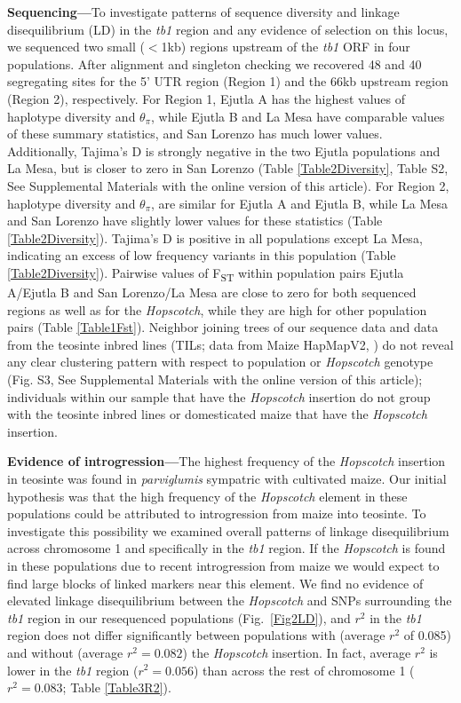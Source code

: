 \documentclass[11pt]{article} %
\begin{document}
\begin{linenumbers}
\begin{flushleft}
\textbf{Sequencing---}To investigate patterns of sequence diversity and linkage disequilibrium (LD) in the \emph{tb1} region and any evidence of selection on this locus, we sequenced two small ($<$1kb) regions upstream of the \emph{tb1} ORF in four populations. After alignment and singleton checking we recovered 48 and 40 segregating sites for the 5' UTR region (Region 1) and the 66kb upstream region (Region 2), respectively. For Region 1, Ejutla A has the highest values of haplotype diversity and $\theta_\pi$, while Ejutla B and La Mesa have comparable values of these summary statistics, and San Lorenzo has much lower values. Additionally, Tajima's D is strongly negative in the two Ejutla populations and La Mesa, but is closer to zero in San Lorenzo (Table \ref{Table2Diversity}, Table S2, See Supplemental Materials with the online version of this article). For Region 2, haplotype diversity and $\theta_\pi$, are similar for Ejutla A and Ejutla B, while La Mesa and San Lorenzo have slightly lower values for these statistics (Table \ref{Table2Diversity}). Tajima's D is positive in all populations except La Mesa, indicating an excess of low frequency variants in this population (Table \ref{Table2Diversity}). Pairwise values of F\textsubscript{ST} within population pairs Ejutla A/Ejutla B and San Lorenzo/La Mesa are close to zero for both sequenced regions as well as for the \emph{Hopscotch}, while they are high for other population pairs (Table \ref{Table1Fst}). Neighbor joining trees of our sequence data and data from the teosinte inbred lines (TILs; data from Maize HapMapV2, \citealt{Chia2012}) do not reveal any clear clustering pattern with respect to population or \emph{Hopscotch} genotype (Fig. S3, See Supplemental Materials with the online version of this article); individuals within our sample that have the \emph{Hopscotch} insertion do not group with the teosinte inbred lines or domesticated maize that have the \emph{Hopscotch} insertion. 

\textbf{Evidence of introgression---}The highest frequency of the \emph{Hopscotch} insertion in teosinte was found in \emph{parviglumis} sympatric with cultivated maize. Our initial hypothesis was that the high frequency of the \emph{Hopscotch} element in these populations could be attributed to introgression from maize into teosinte. To investigate this possibility we examined overall patterns of linkage disequilibrium across chromosome 1 and specifically in the \emph{tb1} region. If the \emph{Hopscotch} is found in these populations due to recent introgression from maize we would expect to find large blocks of linked markers near this element. We find no evidence of elevated linkage disequilibrium between the \emph{Hopscotch} and SNPs surrounding the \emph{tb1} region in our resequenced populations (Fig.~\ref{Fig2LD}), and $r^{2}$ in the \emph{tb1} region  does not differ significantly between populations with (average $r^{2}$ of 0.085) and without (average $r^{2}=0.082$) the \emph{Hopscotch} insertion. In fact, average $r^{2}$ is lower in the \emph{tb1} region ($r^{2}=0.056$) than across the rest of chromosome 1 ($r^{2}=0.083$; Table \ref{Table3R2}).


\end{flushleft}
\end{linenumbers}
\end{document}
